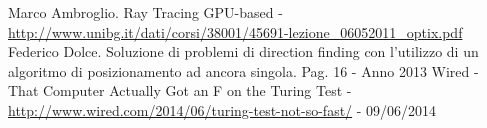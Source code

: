 \begin{thebibliography}{10}
\fancyfoot[C]{\thepage } 
Marco Ambroglio. Ray Tracing GPU-based - \url{http://www.unibg.it/dati/corsi/38001/45691-lezione_06052011_optix.pdf}
Federico Dolce. Soluzione di problemi di direction finding con l'utilizzo di un algoritmo di posizionamento ad ancora singola. Pag. 16 - Anno 2013
Wired - That Computer Actually Got an F on the Turing Test - \url{http://www.wired.com/2014/06/turing-test-not-so-fast/} - 09/06/2014
\end{thebibliography}
